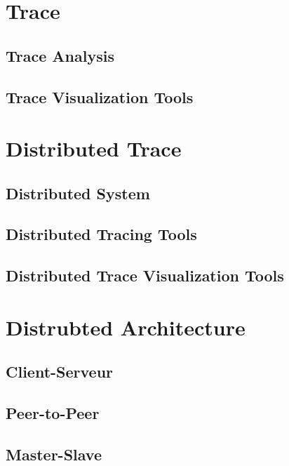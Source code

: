 \label{sec:RevLitt}

\section{Trace}

\subsection{Trace Analysis}

\subsection{Trace Visualization Tools}


\section{Distributed Trace}

\subsection{Distributed System}

\subsection{Distributed Tracing Tools}

\subsection{Distributed Trace Visualization Tools}


\section{Distrubted Architecture}

\subsection{Client-Serveur}

\subsection{Peer-to-Peer}

\subsection{Master-Slave}


